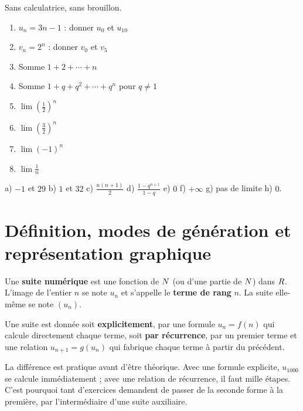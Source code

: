 \begin{automatismes}
Sans calculatrice, sans brouillon.

\begin{enumerate}[label=\textbf{\alph*)}, leftmargin=*, itemsep=0.25em]
  \item $u_{n} = 3n-1$ : donner $u_{0}$ et $u_{10}$
  \item $v_{n} = 2^{n}$ : donner $v_{0}$ et $v_{5}$
  \item Somme $1+2+\cdots+n$
  \item Somme $1+q+q^{2}+\cdots+q^{n}$ pour $q \neq 1$
  \item $\lim\left(\frac12\right)^{n}$
  \item $\lim\left(\frac32\right)^{n}$
  \item $\lim (-1)^{n}$
  \item $\lim \frac{1}{n}$
\end{enumerate}
\end{automatismes}

\begin{corrige}[automatismes]
a) $-1$ et $29$ \quad b) $1$ et $32$ \quad c) $\frac{n(n+1)}{2}$ \quad
d) $\frac{1-q^{n+1}}{1-q}$ \quad e) $0$ \quad f) $+\infty$ \quad
g) pas de limite \quad h) $0$.
\end{corrige}

\section{Définition, modes de génération et représentation graphique}

\begin{definition}
Une \textbf{suite numérique} est une fonction de $N$ (ou d'une partie de
$N$) dans $R$. L'image de l'entier $n$ se note $u_{n}$ et s'appelle le
\textbf{terme de rang} $n$. La suite elle-même se note $(u_{n})$.
\end{definition}

\begin{propriete}
Une suite est donnée soit \textbf{explicitement}, par une formule
$u_{n} = f(n)$ qui calcule directement chaque terme, soit \textbf{par
récurrence}, par un premier terme et une relation $u_{n+1} = g(u_{n})$ qui
fabrique chaque terme à partir du précédent.
\end{propriete}

\begin{remarque}
La différence est pratique avant d'être théorique. Avec une formule
explicite, $u_{1000}$ se calcule immédiatement ; avec une relation de
récurrence, il faut mille étapes. C'est pourquoi tant d'exercices demandent de
passer de la seconde forme à la première, par l'intermédiaire d'une suite
auxiliaire.
\end{remarque}

